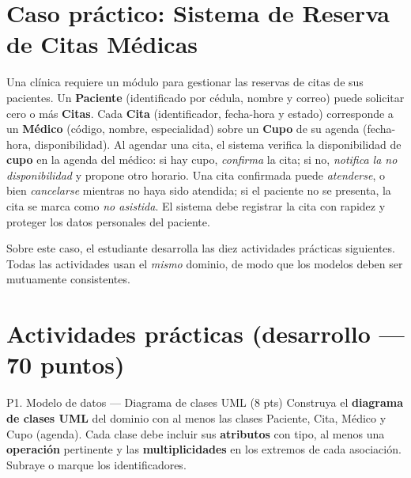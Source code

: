 \documentclass[11pt,a4paper,oneside]{article}
\begin{document}
\section{Caso pr\'actico: Sistema de Reserva de Citas M\'edicas}

Una cl\'inica requiere un m\'odulo para gestionar las reservas de citas de sus pacientes. Un \textbf{Paciente} (identificado por c\'edula, nombre y correo) puede solicitar cero o m\'as \textbf{Citas}. Cada \textbf{Cita} (identificador, fecha-hora y estado) corresponde a un \textbf{M\'edico} (c\'odigo, nombre, especialidad) sobre un \textbf{Cupo} de su agenda (fecha-hora, disponibilidad). Al agendar una cita, el sistema verifica la disponibilidad de \textbf{cupo} en la agenda del m\'edico: si hay cupo, \emph{confirma} la cita; si no, \emph{notifica la no disponibilidad} y propone otro horario. Una cita confirmada puede \emph{atenderse}, o bien \emph{cancelarse} mientras no haya sido atendida; si el paciente no se presenta, la cita se marca como \emph{no asistida}. El sistema debe registrar la cita con rapidez y proteger los datos personales del paciente.

Sobre este caso, el estudiante desarrolla las diez actividades pr\'acticas siguientes. Todas las actividades usan el \emph{mismo} dominio, de modo que los modelos deben ser mutuamente consistentes.

\section{Actividades pr\'acticas (desarrollo --- 70 puntos)}

\begin{tarea}{P1. Modelo de datos --- Diagrama de clases UML \hfill (8 pts)}
Construya el \textbf{diagrama de clases UML} del dominio con al menos las clases \textsf{Paciente}, \textsf{Cita}, \textsf{M\'edico} y \textsf{Cupo} (agenda). Cada clase debe incluir sus \textbf{atributos} con tipo, al menos una \textbf{operaci\'on} pertinente y las \textbf{multiplicidades} en los extremos de cada asociaci\'on. Subraye o marque los identificadores.
\end{tarea}
\end{document}
